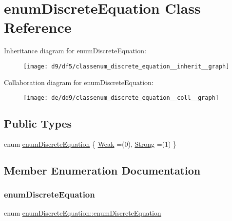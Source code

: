 \hypertarget{classenum_discrete_equation}{}\section{enum\+Discrete\+Equation Class Reference}
\label{classenum_discrete_equation}


Inheritance diagram for enum\+Discrete\+Equation\+:
\nopagebreak
\begin{figure}[H]
\begin{center}
\leavevmode
\texttt{[image: d9/df5/classenum\_discrete\_equation\_\_inherit\_\_graph]}
\end{center}
\end{figure}


Collaboration diagram for enum\+Discrete\+Equation\+:
\nopagebreak
\begin{figure}[H]
\begin{center}
\leavevmode
\texttt{[image: de/dd9/classenum\_discrete\_equation\_\_coll\_\_graph]}
\end{center}
\end{figure}
\subsection*{Public Types}
\begin{DoxyCompactItemize}
\item 
enum \hyperlink{classenum_discrete_equation_a49de71e81bd1c3bdfe67d51dc152d702}{enum\+Discrete\+Equation} \{ \hyperlink{classenum_discrete_equation_a49de71e81bd1c3bdfe67d51dc152d702a317a39aafdd4f38d82cc03f40d04b643}{Weak} =(0), 
\hyperlink{classenum_discrete_equation_a49de71e81bd1c3bdfe67d51dc152d702addc49ded5262916e61284aa5e6f8f558}{Strong} =(1)
 \}
\end{DoxyCompactItemize}


\subsection{Member Enumeration Documentation}
\mbox{\label{classenum_discrete_equation_a49de71e81bd1c3bdfe67d51dc152d702}} 
\subsubsection{\texorpdfstring{enum\+Discrete\+Equation}{enumDiscreteEquation}}
{\footnotesize\ttfamily enum \hyperlink{classenum_discrete_equation_a49de71e81bd1c3bdfe67d51dc152d702}{enum\+Discrete\+Equation\+::enum\+Discrete\+Equation}}

